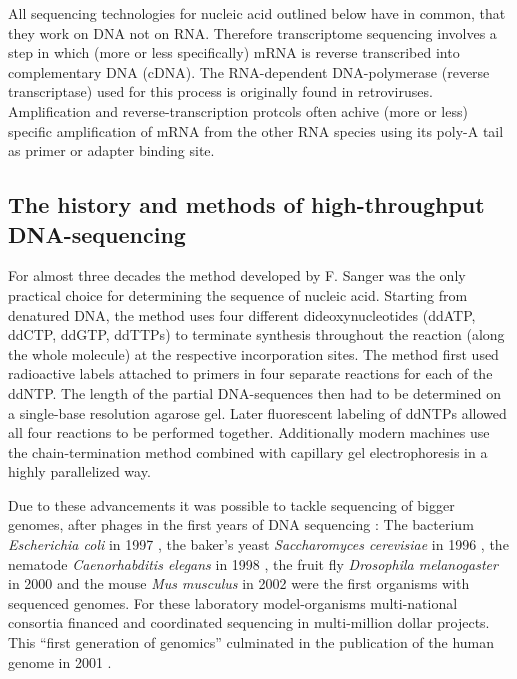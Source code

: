 All sequencing technologies for nucleic acid outlined below have in
common, that they work on DNA not on RNA. Therefore transcriptome
sequencing involves a step in which (more or less specifically) mRNA
is reverse transcribed into complementary DNA (cDNA). The
RNA-dependent DNA-polymerase (reverse transcriptase) used for this
process is originally found in retroviruses. Amplification and
reverse-transcription protcols often achive (more or less) specific
amplification of mRNA from the other RNA species using its poly-A tail
as primer or adapter binding site.

\subsection{The history and methods of high-throughput DNA-sequencing}
\label{his-seq}

For almost three decades the method developed by F. Sanger
\cite{pmid271968} was the only practical choice for determining the
sequence of nucleic acid. Starting from denatured DNA, the method uses
four different dideoxynucleotides (ddATP, ddCTP, ddGTP, ddTTPs) to
terminate synthesis throughout the reaction (along the whole molecule)
at the respective incorporation sites. The method first used
radioactive labels attached to primers in four separate reactions for
each of the ddNTP. The length of the partial DNA-sequences then had to
be determined on a single-base resolution agarose gel. Later
fluorescent labeling of ddNTPs allowed all four reactions to be
performed together. Additionally modern machines use the
chain-termination method combined with capillary gel electrophoresis
\cite{pmid2326186} in a highly parallelized way.

Due to these advancements it was possible to tackle sequencing of
bigger genomes, after phages in the first years of DNA sequencing
\cite{pmid1264203}: The bacterium \textit{Escherichia coli} in 1997
\cite{pmid9278503}, the baker's yeast \textit{Saccharomyces
  cerevisiae} in 1996 \cite{pmid8849441}, the nematode
\textit{Caenorhabditis elegans} in 1998 \cite{pmid9851916}, the fruit
fly \textit{Drosophila melanogaster} in 2000 \cite{adams2000genome}
and the mouse \textit{Mus musculus} in 2002 \cite{pmid12466850} were
the first organisms with sequenced genomes. For these laboratory
model-organisms multi-national consortia financed and coordinated
sequencing in multi-million dollar projects. This ``first generation
of genomics'' culminated in the publication of the human genome in
2001 \cite{pmid11181995}.

